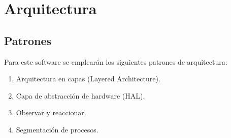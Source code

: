 \documentclass[11pt,a4paper]{article}
\begin{document}
\section{Arquitectura}

\subsection{Patrones}
Para este software se emplearán los siguientes patrones de arquitectura:
\begin{enumerate}
  \item Arquitectura en capas (Layered Architecture).
  \item Capa de abstracción de hardware (HAL).
  \item Observar y reaccionar.
  \item Segmentación de procesos.
\end{enumerate}
\end{document}
